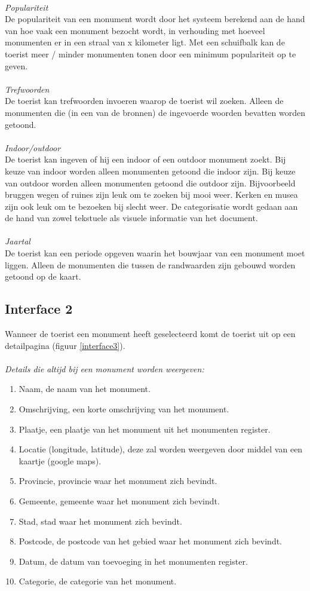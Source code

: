 \documentclass[a4paper,10pt]{article}
\newcommand{\rsubsection}[1]{
\subsection{#1}\label{sec:sub:#1}
}
\begin{document}
			\\
			\textit{Populariteit}\\
			De populariteit van een monument wordt door het systeem berekend aan de hand van hoe vaak een monument bezocht wordt, in verhouding met hoeveel monumenten er in een straal van x kilometer ligt. Met een schuifbalk kan de toerist meer / minder monumenten tonen door een minimum populariteit op te geven.\\
			\\
			\textit{Trefwoorden}\\
			De toerist kan trefwoorden invoeren waarop de toerist wil zoeken. Alleen de monumenten die (in een van de bronnen) de ingevoerde woorden bevatten worden getoond.\\
			\\
			\textit{Indoor/outdoor}\\
			De toerist kan ingeven of hij een indoor of een outdoor monument zoekt. Bij keuze van indoor worden alleen monumenten getoond die indoor zijn. Bij keuze van outdoor worden alleen monumenten getoond die outdoor zijn. Bijvoorbeeld bruggen wegen of ruines zijn leuk om te zoeken bij mooi weer. Kerken en musea zijn ook leuk om te bezoeken bij slecht weer. De categorisatie wordt gedaan aan de hand van zowel tekstuele als visuele informatie van het document.\\
			\\
			\textit{Jaartal}\\
			De toerist kan een periode opgeven waarin het bouwjaar van een monument moet liggen. Alleen de monumenten die tussen de randwaarden zijn gebouwd worden getoond op de kaart.
			\rsubsection{Interface 2}
			Wanneer de toerist een monument heeft geselecteerd komt de toerist uit op een detailpagina (figuur \ref{interface3}).\\
			\\
			\textit{Details die altijd bij een monument worden weergeven:}
			\begin{enumerate}
				\item Naam, de naam van het monument.
				\item Omschrijving, een korte omschrijving van het monument.
				\item Plaatje, een plaatje van het monument uit het monumenten register.
				\item Locatie (longitude, latitude), deze zal worden weergeven door middel van een kaartje (google maps).
				\item Provincie, provincie waar het monument zich bevindt.
				\item Gemeente, gemeente waar het monument zich bevindt.
				\item Stad, stad waar het monument zich bevindt.
				\item Postcode, de postcode van het gebied waar het monument zich bevindt.
				\item Datum, de datum van toevoeging in het monumenten register.
				\item Categorie, de categorie van het monument.
			\end{enumerate}
			
\end{document}
